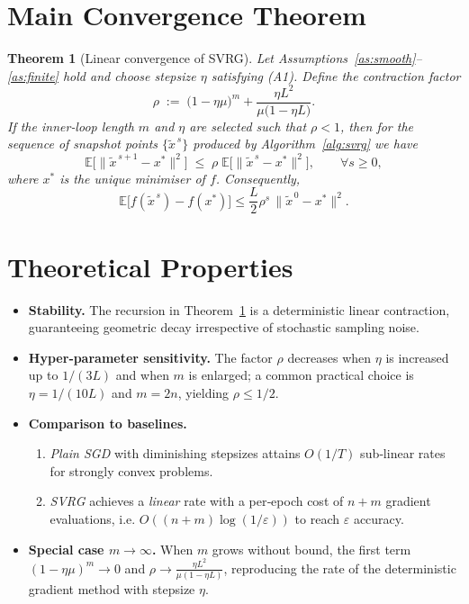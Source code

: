 \documentclass{article}
\newtheorem{theorem}{Theorem}
\newcommand{\E}{\mathbb{E}}
\begin{document}
\section*{Main Convergence Theorem}
\begin{theorem}[Linear convergence of SVRG]\label{thm:linear}
Let Assumptions~\ref{as:smooth}–\ref{as:finite} hold and choose stepsize $\eta$ satisfying (A1).  
Define the contraction factor
\[
\rho\;:=\;\bigl(1-\eta\mu\bigr)^{m}+ \frac{\eta L^{2}}{\mu\bigl(1-\eta L\bigr)}.
\]
If the inner‑loop length $m$ and $\eta$ are selected such that $\rho<1$, then for the sequence of snapshot points $\{\tilde{x}^{\,s}\}$ produced by Algorithm~\ref{alg:svrg} we have
\[
\E\bigl[\|\tilde{x}^{\,s+1}-x^{*}\|^{2}\bigr]\;\le\;\rho\;\E\bigl[\|\tilde{x}^{\,s}-x^{*}\|^{2}\bigr],\qquad\forall s\ge0,
\]
where $x^{*}$ is the unique minimiser of $f$. Consequently,
\[
\E\bigl[f(\tilde{x}^{\,s})-f(x^{*})\bigr]\le \frac{L}{2}\rho^{s}\,\|\tilde{x}^{\,0}-x^{*}\|^{2}.
\]
\end{theorem}

\section*{Theoretical Properties}
\begin{itemize}
\item \textbf{Stability.} The recursion in Theorem~\ref{thm:linear} is a deterministic linear contraction, guaranteeing geometric decay irrespective of stochastic sampling noise.
\item \textbf{Hyper‑parameter sensitivity.} The factor $\rho$ decreases when $\eta$ is increased up to $1/(3L)$ and when $m$ is enlarged; a common practical choice is $\eta=1/(10L)$ and $m=2n$, yielding $\rho\le 1/2$.
\item \textbf{Comparison to baselines.}
    \begin{enumerate}[label=(\alph*)]
    \item \textit{Plain SGD} with diminishing stepsizes attains $O(1/T)$ sub‑linear rates for strongly convex problems.
    \item \textit{SVRG} achieves a \emph{linear} rate with a per‑epoch cost of $n+m$ gradient evaluations, i.e. $O((n+m)\log(1/\varepsilon))$ to reach $\varepsilon$ accuracy.
    \end{enumerate}
\item \textbf{Special case $m\to\infty$.} When $m$ grows without bound, the first term $(1-\eta\mu)^{m}\to0$ and $\rho\to \frac{\eta L^{2}}{\mu(1-\eta L)}$, reproducing the rate of the deterministic gradient method with stepsize $\eta$.
\end{itemize}
\end{document}
